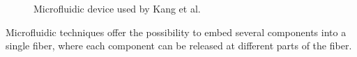 \documentclass[5p,,preprint,12pt,twocolumn]{elsarticle}
\makeatletter
\def\fixFloatSize#1{}%
\makeatother
\begin{document}
\bgroup
\fixFloatSize{images/efb1d6af-4f1a-4c34-9726-b0015b59e112-uimg_microfluid_setup.png}
\begin{figure}[!htbp]
\centering \makeatletter{}
\makeatother 
\caption{{Microfluidic device used by Kang et al.\unskip~\protect\cite{527120:13656548}}}
\label{f-c0beae2757bf}
\end{figure}
\egroup
Microfluidic techniques offer the possibility to embed several components into a single fiber, where each component can be released at different parts of the fiber. 
\end{document}
